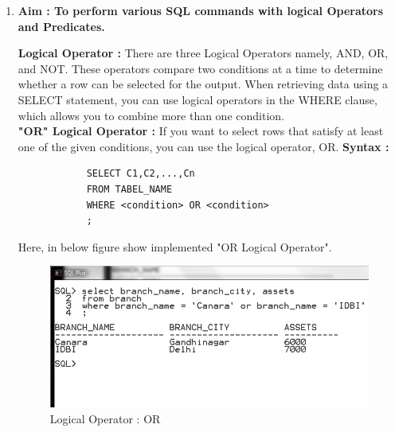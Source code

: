 \documentclass[12pt,a4paper]{report}
\begin{document}
\begin{enumerate}	
	
	\item{\nonumber \fontsize{14}{12} \textbf{Aim : To perform various SQL commands with logical Operators and Predicates.} }{
		\newline
		\textbf{Logical Operator : }		
		There are three Logical Operators namely, AND, OR, and NOT. These operators compare two conditions at a time to determine whether a row can be selected for the output. When retrieving data using a SELECT statement, you can use logical operators in the WHERE clause, which allows you to combine more than one condition.\\
		\textbf{"OR" Logical Operator : }
		If you want to select rows that satisfy at least one of the given conditions, you can use the logical operator, OR.
		\textbf{Syntax :}
		\begin{verbatim}
			SELECT C1,C2,...,Cn
			FROM TABEL_NAME
			WHERE <condition> OR <condition>
			;
		\end{verbatim} 
		Here, in below figure show implemented "OR Logical Operator".
		\begin{figure}[H]
			\centering
			\includegraphics[scale=.55]{./images/prac1_or2}
			\caption{Logical Operator : OR}
		\end{figure}
				 
}
\end{enumerate}
\end{document}
